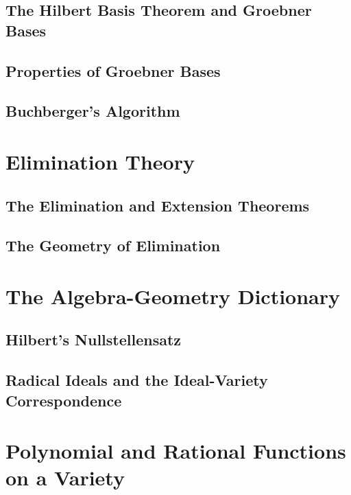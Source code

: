 \documentclass[10pt]{amsart}
\begin{document}
\begin{multicols*}{2}
\subsection{The Hilbert Basis Theorem and Groebner Bases}


\subsection{Properties of Groebner Bases}



\subsection{Buchberger's Algorithm}






\section{Elimination Theory}



\subsection{The Elimination and Extension Theorems}


\subsection{The Geometry of Elimination}



\section{The Algebra-Geometry Dictionary}


\subsection{Hilbert's Nullstellensatz}


\subsection{Radical Ideals and the Ideal-Variety Correspondence}



\section{Polynomial and Rational Functions on a Variety}



\end{multicols*}
\end{document}
